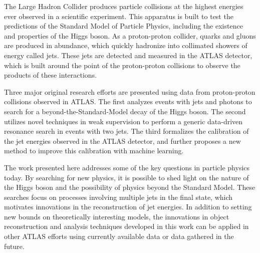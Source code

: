 The Large Hadron Collider produces particle collisions at the highest energies ever observed in a scientific experiment.
This apparatus is built to test the predictions of the Standard Model of Particle Physics, including the existence and properties of the Higgs boson.
As a proton-proton collider, quarks and gluons are produced in abundance, which quickly hadronize into collimated showers of energy called jets.
These jets are detected and measured in the ATLAS detector, which is built around the point of the proton-proton collisions to observe the products of these interactions.

Three major original research efforts are presented using data from proton-proton collisions observed in ATLAS.
The first analyzes events with jets and photons to search for a beyond-the-Standard-Model decay of the Higgs boson.
The second utilizes novel techniques in weak supervision to perform a generic data-driven resonance search in events with two jets.
The third formalizes the calibration of the jet energies observed in the ATLAS detector, and further proposes a new method to improve this calibration with machine learning.

The work presented here addresses some of the key questions in particle physics today.
By searching for new physics, it is possible to shed light on the nature of the Higgs boson and the possibility of physics beyond the Standard Model. 
These searches focus on processes involving multiple jets in the final state, which motivates innovations in the reconstruction of jet energies.
In addition to setting new bounds on theoretically interesting models, the innovations in object reconstruction and analysis techniques developed in this work can be applied in other ATLAS efforts using currently available data or data gathered in the future.
